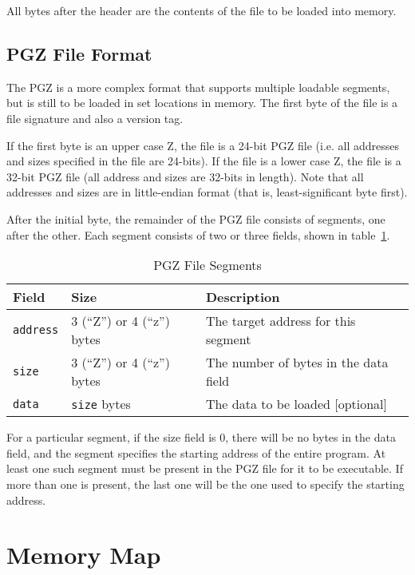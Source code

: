 All bytes after the header are the contents of the file to be loaded into memory.

\subsection*{PGZ File Format}
The PGZ is a more complex format that supports multiple loadable segments, but is still to be loaded in set locations in memory.
The first byte of the file is a file signature and also a version tag.

If the first byte is an upper case Z, the file is a 24-bit PGZ file (i.e. all addresses and sizes specified in the file are 24-bits).
If the file is a lower case Z, the file is a 32-bit PGZ file (all address and sizes are 32-bits in length).
Note that all addresses and sizes are in little-endian format (that is, least-significant byte first).

After the initial byte, the remainder of the PGZ file consists of segments, one after the other. Each segment consists of two or three fields,
shown in table~\ref{tbl:pgz_file_segments}.

\begin{table}
	\begin{center}
		\begin{tabular}{|l|l|l|} \hline
			Field &	Size & Description \\ \hline\hline
			\verb+address+ & 3 (“Z”) or 4 (“z”) bytes & The target address for this segment \\ \hline
			\verb+size+ & 3 (“Z”) or 4 (“z”) bytes & The number of bytes in the data field \\ \hline
			\verb+data+ & \verb+size+ bytes & The data to be loaded [optional] \\ \hline
		\end{tabular}
	\end{center}
	\caption{PGZ File Segments}
	\label{tbl:pgz_file_segments}
\end{table}

For a particular segment, if the size field is 0, there will be no bytes in the data field,
and the segment specifies the starting address of the entire program.
At least one such segment must be present in the PGZ file for it to be executable.
If more than one is present, the last one will be the one used to specify the starting address.

\section{Memory Map}

